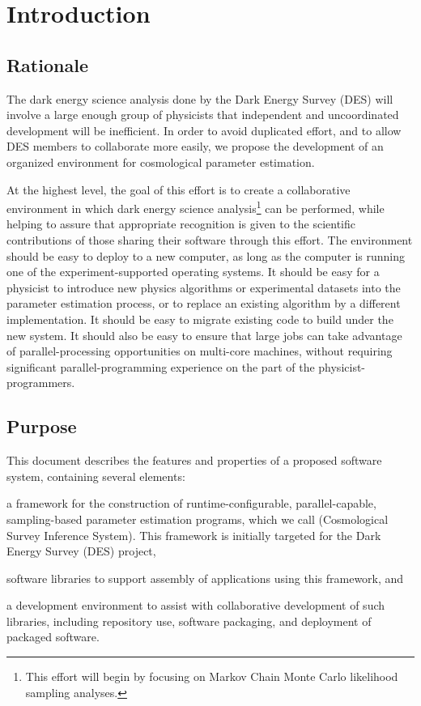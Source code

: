 \documentclass{memarticle}
\newcommand{\cosmosis}{\name{CosmoSIS}\xspace}
\begin{document}
	
\topmatter %

\chapter{Introduction\label{ch:introduction}}

\section{Rationale\label{sec:rationale}}

The dark energy science analysis done by the Dark Energy Survey (DES) will involve a large enough
group of physicists that independent and uncoordinated development will
be inefficient. In order to avoid duplicated effort, and to allow DES
members to collaborate more easily, we propose the development of an
organized environment for cosmological parameter estimation.

At the highest level, the goal of this effort is to create a
collaborative environment in which dark energy science
analysis\footnote{This effort will begin by focusing on Markov Chain
  Monte Carlo likelihood sampling analyses.} can be performed, while
helping to assure that appropriate recognition is given to the
scientific contributions of those sharing their software through this effort.
The
environment should be easy to deploy to a new computer, as long as the
computer is running one of the experiment-supported operating systems.
It should be easy for a physicist to introduce new physics algorithms or experimental datasets
into the parameter estimation process, or to replace an existing
algorithm by a different implementation. It should be easy to migrate
existing code to build under the new system. It should also be easy to
ensure that large jobs can take advantage of parallel-processing
opportunities on multi-core machines, without requiring significant
parallel-programming experience on the part of the
physicist-programmers.

\section{Purpose\label{sec:purpose}}

This document describes the features and properties of a proposed
software system, containing several elements:
\begin{inparaenum}[(a)]
\item a framework for the construction of runtime-configurable,
  parallel-capable, sampling-based parameter estimation programs, which
  we call \cosmosis (Cosmological Survey Inference System). This
  framework is initially targeted for the Dark Energy Survey
  (DES)\cite{des} project,
\item software libraries to support assembly of applications using this
  framework, and
\item a development environment to assist with collaborative development
  of such libraries, including repository use, software packaging, and
  deployment of packaged software.
\end{inparaenum}
\end{document}
